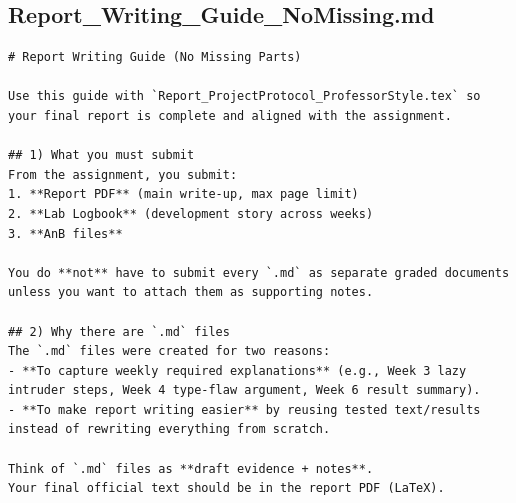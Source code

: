 \documentclass[11pt,a4paper]{article}
\begin{document}
\subsection{Report\_Writing\_Guide\_NoMissing.md}
\begin{lstlisting}
# Report Writing Guide (No Missing Parts)

Use this guide with `Report_ProjectProtocol_ProfessorStyle.tex` so your final report is complete and aligned with the assignment.

## 1) What you must submit
From the assignment, you submit:
1. **Report PDF** (main write-up, max page limit)
2. **Lab Logbook** (development story across weeks)
3. **AnB files**

You do **not** have to submit every `.md` as separate graded documents unless you want to attach them as supporting notes.

## 2) Why there are `.md` files
The `.md` files were created for two reasons:
- **To capture weekly required explanations** (e.g., Week 3 lazy intruder steps, Week 4 type-flaw argument, Week 6 result summary).
- **To make report writing easier** by reusing tested text/results instead of rewriting everything from scratch.

Think of `.md` files as **draft evidence + notes**.
Your final official text should be in the report PDF (LaTeX).
\end{lstlisting}
\end{document}
